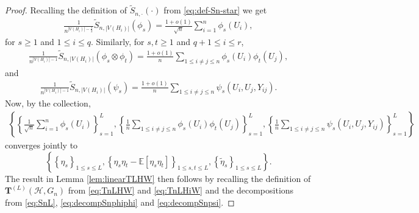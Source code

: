 \documentclass[11pt,reqno]{amsart}
\numberwithin{equation}{section}
\theoremstyle{definition}
\begin{document}
\begin{proof}
Recalling the definition of $\tilde S_{n, \cdot}(\cdot)$ from \eqref{eq:def-Sn-star} we get 
\begin{align}\label{eq:SnL}
\frac{1}{n^{|V(H_i)|-\frac{1}{2}}}\tilde S_{n,|V(H_i)|}(\phi_s) = \frac{1+o(1)}{\sqrt n }\sum_{i=1}^n \phi_s(U_i), 
\end{align} 
for $s \geq 1$ and $1 \leq i \leq q$. Similarly, for $s , t \geq 1$ and $q+1 \leq i \leq r$, 
\begin{align}\label{eq:decompSnphiphi}
\frac{1}{n^{|V(H_i)|-1}}\tilde S_{n,|V(H_i)|}(\phi_s \otimes \phi_t) = \frac{1+o(1)}{n}\sum_{1 \leq i \ne j \leq n} \phi_s(U_i) \phi_t(U_j) , 
\end{align} 
and 
\begin{align}\label{eq:decompSnpsi}
\frac{1}{n^{|V(H_i)|-1}}\tilde S_{n,|V(H_i)|}(\psi_s) = \frac{1+o(1)}{n}\sum_{1 \leq i \ne j \leq n} \psi_s(U_i, U_j, Y_{ij}) . 
\end{align} 
Now, by \cite[Lemma 8]{janson1991asymptotic} the collection,
\begin{align*}
    \left\{\left\{\frac{1}{\sqrt{n}}\sum_{i=1}^{n}\phi_s(U_i)\right\}_{s=1}^{L}, \left\{\frac{1}{n}\sum_{1 \leq i \ne j \leq n} \phi_s(U_i) \phi_t(U_j)\right\}_{s=1}^L, \left\{\frac{1}{n}\sum_{1 \leq i \ne j \leq n} \psi_s(U_i, U_j, Y_{ij})\right\}_{s=1}^{L}\right\}
\end{align*}
converges jointly to 
$$\left\{ \left\{ \eta_s \right\}_{1 \leq s \leq L}, \left\{ \eta_s \eta_t - \mathbb E[\eta_s \eta_t] \right\}_{1 \leq s, t \leq L}, \left\{ \tilde\eta_s \right\}_{1 \leq s \leq L} \right\} . $$
The result in Lemma \ref{lem:linearTLHW} then follows by recalling the definition of  $\bm T^{(L)}(\mathcal H, G_n)$ from \eqref{eq:TnLHW} and \eqref{eq:TnLHiW} and the decompositions from \eqref{eq:SnL}, \eqref{eq:decompSnphiphi} and \eqref{eq:decompSnpsi}.

\end{proof}
\end{document}
